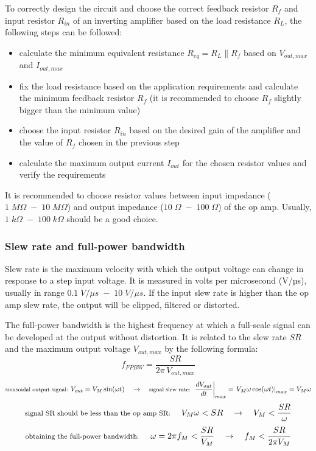 \noindent
To correctly design the circuit and choose the correct feedback resistor \(R_f\) and input resistor \(R_{in}\) of an inverting
amplifier based on the load resistance \(R_L\), the following steps can be followed:
\begin{itemize}
	\item[1.] calculate the minimum equivalent resistance \(R_{eq} = R_L \parallel R_f\) based on \(V_{out, max}\) and \(I_{out, max}\)
	\item[2.] fix the load resistance based on the application requirements and calculate the minimum feedback resistor \(R_f\)
	(it is recommended to choose \(R_f\) slightly bigger than the minimum value)
	\item[3.] choose the input resistor \(R_{in}\) based on the desired gain of the amplifier and the value of \(R_f\) chosen
	in the previous step
	\item[4.] calculate the maximum output current \(I_{out}\) for the chosen resistor values and verify the requirements
\end{itemize}
It is recommended to choose resistor values between input impedance (\(1 \; M\Omega \; - \; 10 \; M\Omega\)) and output impedance
(\(10 \; \Omega \; - \; 100 \; \Omega\)) of the op amp. Usually, \(1 \; k\Omega \; - \; 100 \; k\Omega\) should be a good choice.

\subsubsection*{Slew rate and full-power bandwidth}
Slew rate is the maximum velocity with which the output voltage can change in response to a step input voltage. It is measured
in volts per microsecond (V/µs), usually in range \(0.1 \; V/\mu s \; - \; 10 \; V/\mu s\). If the input slew rate is higher than the op amp slew rate, the output will be clipped, filtered
or distorted.

The full-power bandwidth is the highest frequency at which a full-scale signal can be developed at the output without distortion.
It is related to the slew rate \(SR\) and the maximum output voltage \(V_{out, max}\) by the following formula:
\[f_{FPBW} = \frac{SR}{2 \pi \, V_{out, max}}\]
\[\text{\footnotesize sinusoidal output signal: } V_{out} = V_M \sin (\omega t) \quad \rightarrow \quad \text{\footnotesize signal slew rate: } \left. \frac{d V_{out}}{d t} \right|_{max} = \left. V_M \omega \cos (\omega t) \right|_{max} = V_M \omega\]
\[\text{\footnotesize signal SR should be less than the op amp SR: } \quad V_M \omega < SR \quad \rightarrow \quad V_M < \frac{SR}{\omega}\]
\[\text{\footnotesize obtaining the full-power bandwidth: } \quad \omega = 2 \pi f_M < \frac{SR}{V_M} \quad \rightarrow \quad f_M < \frac{SR}{2 \pi V_M}\]
